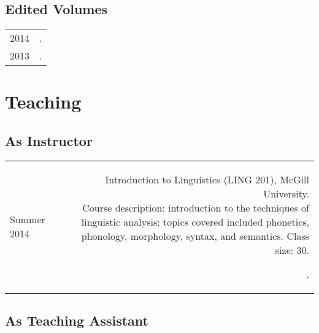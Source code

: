 \documentclass[11pt,letterpaper,twoside]{article}
\makeatletter
\newcommand{\bodywidth}{0.75}
\newenvironment{cvsection}{%
  \renewcommand{\arraystretch}{1.75}
  \begin{longtable}[l]{@{} L R @{}}
}{%
  \end{longtable}
}
\newcommand{\course}[3]{%
  \parbox[t]{\bodywidth\textwidth}{#1.\\ {\footnotesize Course description: #2.
      Class size: #3.}}
}
\makeatother
\begin{document}
\subsection*{Edited Volumes}

\begin{cvsection}
  2014 & \null{}.\\
  2013 & \null{}.
\end{cvsection}

\section*{Teaching}

\subsection*{As Instructor}

\begin{cvsection}
  {\small Summer} 2014 & \course{Introduction to Linguistics (LING 201), McGill
    University}{introduction to the techniques of linguistic analysis; topics
    covered included phonetics, phonology, morphology, syntax, and
    semantics}{30}.
\end{cvsection}

\subsection*{As Teaching Assistant}
\end{document}
